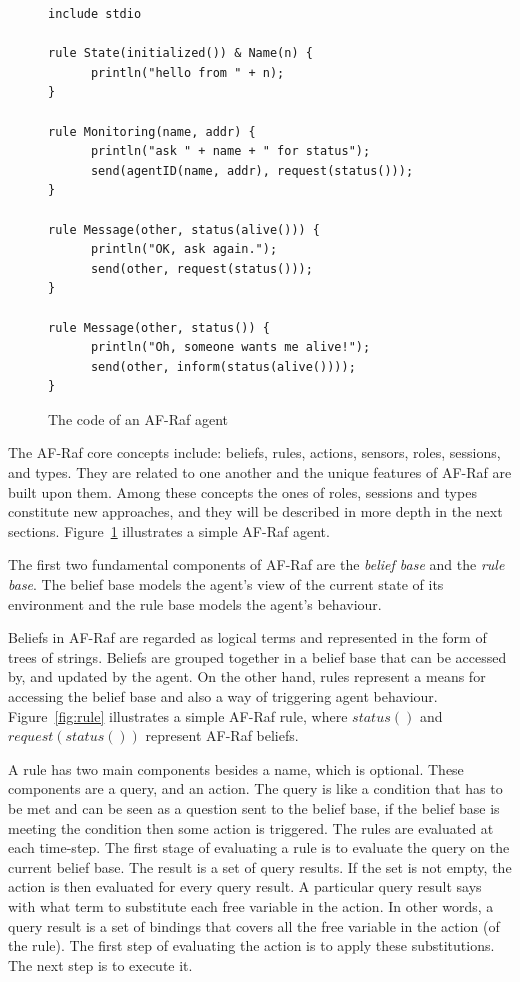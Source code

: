 \documentclass[a4paper,12pt,oneside,fleqn]{book} %
\begin{document}
\begin{figure}\footnotesize %
\begin{verbatim}
include stdio

rule State(initialized()) & Name(n) {
      println("hello from " + n);
}

rule Monitoring(name, addr) {
      println("ask " + name + " for status");
      send(agentID(name, addr), request(status()));
}

rule Message(other, status(alive())) {
      println("OK, ask again.");
      send(other, request(status()));
}

rule Message(other, status()) {
      println("Oh, someone wants me alive!");
      send(other, inform(status(alive())));
}
\end{verbatim}
\caption{The code of an AF-Raf agent}
\label{fig:AF-Raf}
\end{figure} %

The AF-Raf core concepts include: beliefs, rules, actions, sensors, roles,
sessions, and types. They are related to one another and the unique
features of AF-Raf are built upon them. Among these concepts the ones of
roles, sessions and types constitute new approaches, and they will be
described in more depth in the next sections. Figure~\ref{fig:AF-Raf}
illustrates a simple AF-Raf agent.

The first two fundamental components of AF-Raf are the \textit{belief base}
and the \textit{rule base}. The belief base models the agent's view of the
current state of its environment and the rule base models the agent's
behaviour.

Beliefs in AF-Raf are regarded as logical terms and represented in the form
of trees of strings. Beliefs are grouped together in a belief base that can
be accessed by, and updated by the agent. On the other hand, rules
represent a means for accessing the belief base and also a way of
triggering agent behaviour. Figure~\ref{fig:rule} illustrates a simple
AF-Raf rule, where $status()$ and $request(status())$ represent AF-Raf
beliefs.

A rule has two main components besides a name, which is optional. These
components are a query, and an action. The query is like a condition that
has to be met and can be seen as a question sent to the belief base, if the
belief base is meeting the condition then some action is triggered. The
rules are evaluated at each time-step. The first stage of evaluating a rule
is to evaluate the query on the current belief base. The result is a set of
query results. If the set is not empty, the action is then evaluated for
every query result. A particular query result says with what term to
substitute each free variable in the action. In other words, a query result
is a set of bindings that covers all the free variable in the action (of
the rule). The first step of evaluating the action is to apply these
substitutions. The next step is to execute it.
\end{document}
